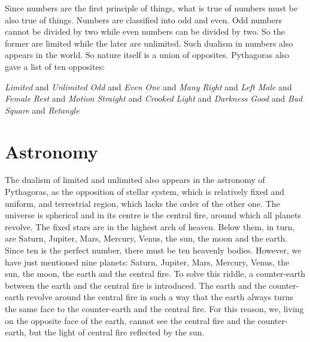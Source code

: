 \documentclass[11pt]{article}
\begin{document}
\newline

Since numbers are the first principle of things, what is true of numbers must be also true of things. 
Numbers are classified into odd and even. 
Odd numbers cannot be divided by two while even numbers can be divided by two. 
So the former are limited while the later are unlimited. 
Such dualism in numbers also appears in the world. 
So nature itself is a union of opposites. 
Pythagoras also gave a list of ten opposites:

\begin{center}
    \textit{Limited} and \textit{Unlimited}
    \newline
    \textit{Odd} and \textit{Even}
    \newline
    \textit{One} and \textit{Many}
    \newline
    \textit{Right} and \textit{Left}
    \newline
    \textit{Male} and \textit{Female}
    \newline
    \textit{Rest} and \textit{Motion}
    \newline
    \textit{Straight} and \textit{Crooked}
    \newline
    \textit{Light} and \textit{Darkness}
    \newline
    \textit{Good} and \textit{Bad}
    \newline
    \textit{Square} and \textit{Retangle}
\end{center}


\section{Astronomy}
The dualism of limited and unlimited also appears in the astronomy of Pythagoras, as the opposition of stellar system, which is relatively fixed and uniform, and terrestrial region, which lacks the order of the other one. 
The universe is spherical and in its centre is the central fire, around which all planets revolve. 
The fixed stars are in the highest arch of heaven. 
Below them, in turn, are Saturn, Jupiter, Mars, Mercury, Venus, the sun, the moon and the earth. 
Since ten is the perfect number, there must be ten heavenly bodies. 
However, we have just mentioned nine planets: Saturn, Jupiter, Mars, Mercury, Venus, the sun, the moon, the earth and the central fire. 
To solve this riddle, a counter-earth between the earth and the central fire is introduced. 
The earth and the counter-earth revolve around the central fire in such a way that the earth always turns the same face to the counter-earth and the central fire. 
For this reason, we, living on the opposite face of the earth, cannot see the central fire and the counter-earth, but the light of central fire reflected by the sun.
\end{document}
